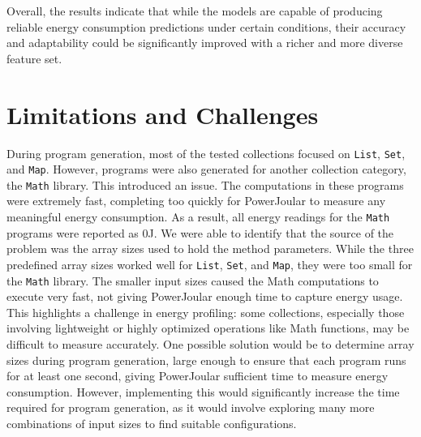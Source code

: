 Overall, the results indicate that while the models are capable of producing reliable energy consumption predictions under certain conditions, their accuracy and adaptability could be significantly improved with a richer and more diverse feature set.









\section{Limitations and Challenges} \label{sec:limitations_and_challenges}

During program generation, most of the tested collections focused on \texttt{List}, \texttt{Set}, and \texttt{Map}. However, programs were also generated for another collection category, the \texttt{Math} library. This introduced an issue. The computations in these programs were extremely fast, completing too quickly for PowerJoular to measure any meaningful energy consumption. As a result, all energy readings for the \texttt{Math} programs were reported as 0J.
We were able to identify that the source of the problem was the array sizes used to hold the method parameters. While the three predefined array sizes worked well for \texttt{List}, \texttt{Set}, and \texttt{Map}, they were too small for the \texttt{Math} library. The smaller input sizes caused the Math computations to execute very fast, not giving PowerJoular enough time to capture energy usage.
This highlights a challenge in energy profiling: some collections, especially those involving lightweight or highly optimized operations like Math functions, may be difficult to measure accurately. One possible solution would be to determine array sizes during program generation, large enough to ensure that each program runs for at least one second, giving PowerJoular sufficient time to measure energy consumption. However, implementing this would significantly increase the time required for program generation, as it would involve exploring many more combinations of input sizes to find suitable configurations. 

